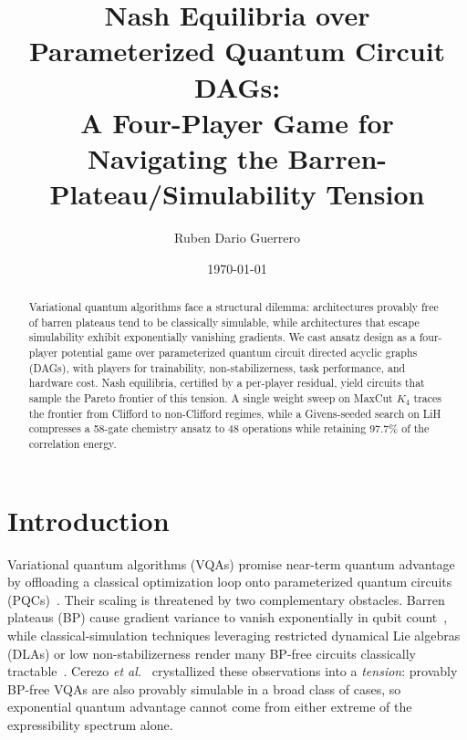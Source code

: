 \documentclass[prl,twocolumn,aps,superscriptaddress,showkeys,floatfix,nofootinbib]{revtex4-2}
\begin{document}
\title{Nash Equilibria over Parameterized Quantum Circuit DAGs:\\
A Four-Player Game for Navigating the Barren-Plateau/Simulability Tension}

\author{Ruben Dario Guerrero}

\date{\today}


\begin{abstract}
Variational quantum algorithms face a structural dilemma: architectures provably free of barren plateaus tend to be classically simulable, while architectures that escape simulability exhibit exponentially vanishing gradients. We cast ansatz design as a four-player potential game over parameterized quantum circuit directed acyclic graphs (DAGs), with players for trainability, non-stabilizerness, task performance, and hardware cost. Nash equilibria, certified by a per-player residual, yield circuits that sample the Pareto frontier of this tension. A single weight sweep on MaxCut $K_4$ traces the frontier from Clifford to non-Clifford regimes, while a Givens-seeded search on LiH compresses a 58-gate chemistry ansatz to 48 operations while retaining 97.7\% of the correlation energy.
\end{abstract}

\maketitle

\section{Introduction}

Variational quantum algorithms (VQAs) promise near-term quantum advantage by offloading a classical optimization loop onto parameterized quantum circuits (PQCs)~\cite{cerezo2021variational,bharti2022noisy}. Their scaling is threatened by two complementary obstacles. Barren plateaus (BP) cause gradient variance to vanish exponentially in qubit count~\cite{mcclean2018barren,ragone2024lie}, while classical-simulation techniques leveraging restricted dynamical Lie algebras (DLAs) or low non-stabilizerness render many BP-free circuits classically tractable~\cite{cerezo2025does}. Cerezo \textit{et al.}~\cite{cerezo2025does} crystallized these observations into a \emph{tension}: provably BP-free VQAs are also provably simulable in a broad class of cases, so exponential quantum advantage cannot come from either extreme of the expressibility spectrum alone.
\end{document}
